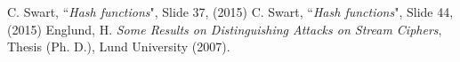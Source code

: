 \begin{thebibliography}{99}
        C. Swart, ``{\it Hash functions}", Slide 37, (2015)
        C. Swart, ``{\it Hash functions}", Slide 44, (2015)
		Englund, H. \emph{Some Results on Distinguishing Attacks
		on Stream Ciphers}, Thesis (Ph. D.), Lund University (2007).
    
\end{thebibliography}
